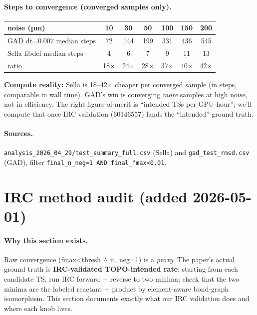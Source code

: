 \documentclass[11pt]{article}
\begin{document}
\paragraph{Steps to convergence (converged samples only).}

\begin{center}\small
\begin{tabular}{l|cccccc}
\toprule
noise (pm)                                & 10 & 30 & 50 & 100 & 150 & 200 \\
\midrule
GAD dt=0.007 median steps                 & 72 & 144 & 199 & 331 & 436 & 545 \\
Sella libdef median steps                 & 4  & 6   & 7   & 9   & 11  & 13  \\
\midrule
ratio                                     & 18$\times$ & 24$\times$ & 28$\times$ & 37$\times$ & 40$\times$ & 42$\times$ \\
\bottomrule
\end{tabular}
\end{center}

\textbf{Compute reality:} Sella is 18--42$\times$ cheaper per converged
sample (in steps, comparable in wall time). GAD's win is converging
\emph{more} samples at high noise, not in efficiency. The right
figure-of-merit is ``intended TSs per GPU-hour''; we'll compute that
once IRC validation (60146557) lands the ``intended'' ground truth.

\paragraph{Sources.} \texttt{analysis\_2026\_04\_29/test\_summary\_full.csv}
(Sella) and \texttt{gad\_test\_rmsd.csv} (GAD), filter
\texttt{final\_n\_neg=1 AND final\_fmax<0.01}.

\section{IRC method audit (added 2026-05-01)}

\paragraph{Why this section exists.} Raw convergence (fmax<thresh $\wedge$
n\_neg=1) is a \emph{proxy}. The paper's actual ground truth is
\textbf{IRC-validated TOPO-intended rate}: starting from each candidate
TS, run IRC forward + reverse to two minima; check that the two minima
are the labeled reactant + product by element-aware bond-graph
isomorphism. This section documents exactly what our IRC validation
does and where each knob lives.
\end{document}
